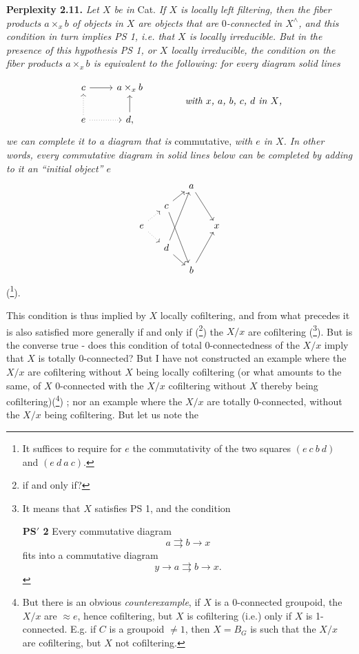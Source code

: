 \textbf{Perplexity 2.11.} \textit{Let $X$ be in} Cat. \textit{If $X$ is locally left filtering, then the fiber products $a\times_x b$ of objects in $X$ are objects that are} $0$\textit{-connected in $X^\wedge$, and this condition in turn implies PS 1, i.e. that $X$ is locally irreducible. But in the presence of this hypothesis PS 1, or $X$ locally irreducible, the condition on the fiber products $a\times_x b$ is equivalent to the following: for every diagram} \textit{solid lines}

\[
\begin{tikzcd}
c \arrow[r] & a\times_x b \\
e \arrow[u, dotted] \arrow[r, dotted] & d, \arrow[u]
\end{tikzcd}
\qquad\qquad
\textit{with $x$, $a$, $b$, $c$, $d$ in $X$,}
\]
\textit{we can complete it to a diagram that is} commutative, \textit{with $e$ in $X$. In other words, every commutative diagram in solid lines below can be completed by adding to it an ``initial object'' $e$} %
\[
\begin{tikzcd}[column sep=small, row sep=small]
 & & a \arrow[ddr] & \\
 & c \arrow[ur] \arrow[dddr] & & \\
e \arrow[ur, dotted] \arrow[dr, dotted] & & & x \\
 & d \arrow[uuur] \arrow[dr] & & \\
 & & b \arrow[uur] &
\end{tikzcd}
\]
(\footnote[33]{It suffices to require for $e$ the commutativity of the two squares $(e\ c\ b\ d)$ and $(e\ d\ a\ c)$.}).

This condition is thus implied by $X$ locally cofiltering, and from what precedes it is also satisfied more generally if and only if (\footnote[34]{if and only if?}) the $X/x$ are cofiltering (\footnote[35]{It means that $X$ satisfies PS 1, and the condition

\textbf{PS$'$ 2} Every commutative diagram
\[
a\rightrightarrows b\longrightarrow x
\]
fits into a commutative diagram
\[
y\longrightarrow a\rightrightarrows b\longrightarrow x.
\]
}). But is the converse true - does this condition of total 0-connectedness of the $X/x$ imply that $X$ is totally 0-connected? But I have not constructed an example where the $X/x$
are cofiltering without $X$ being locally cofiltering (or what amounts to the same, of $X$ 0-connected with the $X/x$ cofiltering without $X$ thereby being cofiltering)(\footnote[36]{But there is an obvious \textit{counterexample}, if $X$ is a 0-connected groupoid, the $X/x$ are $\approx e$, hence cofiltering, but $X$ is cofiltering (i.e.) only if $X$ is 1-connected. E.g. if $C$ is a groupoid $\neq 1$, then $X=B_G$ is such that the $X/x$ are cofiltering, but $X$ not cofiltering. %
}) ; nor an example where the $X/x$ are totally 0-connected, without the $X/x$ being cofiltering. But let us note the

